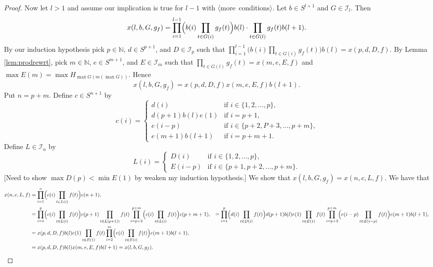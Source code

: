 \documentclass[12pt]{article}
\theoremstyle{plain}
\theoremstyle{definition}
\newcommand{\la}{\langle}
\newcommand{\ra}{\rangle}
\newcommand{\bbN}{\mathbb{N}}
\newcommand{\calI}{\mathcal{I}}
\begin{document}
\begin{proof}
  Now let $l > 1$ and assume our implication is true for $l-1$ with
  \mbox{$\la$more conditions$\ra$}. 
  Let $b \in S^{l+1}$ and $G \in \calI_l$.
  Then 
  \[
    x(l, b, G, g_f) = \prod_{i=1}^{l-1}\Bigl(b(i) \prod_{t \in G(i)}
    g_f(t) \Bigr) b(l) \cdot \prod_{t \in G(l)} g_f(t) b(l+1).
  \]
  By our induction hypothesis pick $p \in \bbN$, $d \in S^{p+1}$, and
  $D \in \calI_p$ such that $\prod_{i=1}^{l-1}\bigl(b(i) \prod_{t \in
    G(i)} g_f(t)\bigr)b(l) = x(p, d, D, f)$.
  By Lemma \ref{lem:prodrewrt}, pick $m \in \bbN$, $e \in S^{m+1}$,
  and $E \in \calI_m$ such that $\prod_{t \in G(l)} g_f(t) = x(m, e,
  E, f)$ and $\max E(m) = \max H_{\max G(m(\max G))}$.
  Hence
  \[
    x(l, b, G, g_f) = x(p, d, D, f)x(m,e,E,f)b(l+1).
  \]
  Put $n = p+m$. 
  Define $c \in S^{n+1}$ by
  \[
    c(i) = 
    \begin{cases}
      d(i) & \mbox{if $i \in \{1, 2, \ldots, p\}$,} \\
      d(p+1)b(l)e(1) & \mbox{if $i=p+1$,} \\
      e(i-p) & \mbox{if $i \in \{p+2, P+3, \ldots, p+m\}$,} \\
      e(m+1)b(l+1) & \mbox{if $i = p + m + 1$.}
    \end{cases}
  \]
  Define $L \in \calI_n$ by
  \[
    L(i) = 
    \begin{cases}
      D(i) & \mbox{if $i \in \{1, 2, \ldots, p\}$}, \\
      E(i-p) & \mbox{if $i \in \{p+1, p+2, \ldots, p+m \}$}.
    \end{cases}
  \]
  [Need to show $\max D(p) < \min E(1)$ by weaken my induction
  hypothesis.] 
  We show that $x(l, b, G, g_f) = x(n, c, L, f)$.
  We have that
  \begin{align*}
    x(n, c, L, f) &= \prod_{i=1}^n\Bigl( c(i) \prod_{t \in L(i)} f(t)
    \Bigr) c(n+1), \\
    &= \prod_{i=1}^p\Bigl( c(i) \prod_{t \in L(i)} f(t) \Bigr) c(p+1)
    \prod_{t \in L(p+1))} f(t) \prod_{i=p+2}^{p+m}\Bigl( c(i) \prod_{t \in L(i)} f(t)
    \Bigr) c(p+m+1),
    &= \prod_{i=1}^p\Bigl( d(i) \prod_{t \in D(i)} f(t) \Bigr) d(p+1)b(l)e(1)
    \prod_{t \in E(1)} f(t) \prod_{i=p+2}^{p+m}\Bigl( e(i-p) \prod_{t \in E(i-p)} f(t)
    \Bigr) e(m+1)b(l+1), \\
    &= x(p, d, D, f) b(l) e(1)
    \prod_{t \in E(1)} f(t) \prod_{i=2}^{m}\Bigl( e(i) \prod_{t \in E(i)} f(t)
    \Bigr) e(m+1)b(l+1), \\
    &= x(p, d, D, f) b(l) x(m, e, E, f) b(l+1) = x(l, b, G, g_f).
  \end{align*}


\end{proof}
\end{document}

